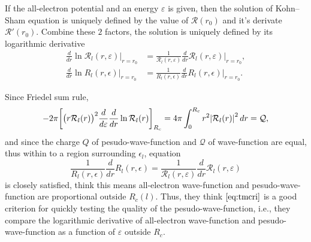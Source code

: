 If the all-electron potential and an energy $\varepsilon$ is given,
then the solution of Kohn--Sham equation is uniquely defined by the
value of $\mathcal{R}(r_0)$ and it's derivate $\mathcal{R}'(r_0)$. Combine
these $2$ factors, the solution is uniquely defined by its  logarithmic
derivative
\begin{align}\label{eq:ld}
	\frac{ d }{ dr } \ln \mathcal{R}_l (r, \varepsilon) \bigg|_{r = r_0}
  &= \frac{ 1 }{ \mathcal{R}_l (r, \varepsilon) }
  \frac{ d }{ dr } \mathcal{R}_l (r, \varepsilon) \bigg|_{r = r_0}, \\
  \frac{ d }{ dr } \ln R_l (r, \epsilon) \bigg|_{r = r_0}
  &= \frac{ 1 }{ R_l (r, \epsilon) }
  \frac{ d }{ dr } R_l (r, \epsilon) \bigg|_{r = r_0}.
\end{align}

Since Friedel sum rule,\cite{Topp:1973cp}
\begin{equation}
	- 2\pi \bigg[ \big(r \mathcal{R}_l(r) \big) ^ 2 \frac{ d }{ d\varepsilon } \frac{ d }{ dr } \ln \mathcal{R}_l(r) \bigg]_{R_c} = 4\pi \int_{0}^{R_c} r^2 \abs{\mathcal{R}_l(r)}^2 \, dr = \mathcal{Q},
\end{equation}
and since the charge $Q$ of pesudo-wave-function and $\mathcal{Q}$ of
wave-function are equal, thus within to a region surrounding $\epsilon_l$,
equation
\begin{equation}\label{eq:tmcri}
	\frac{ 1 }{ R_l (r, \epsilon) }
	\frac{ d }{ dr } R_l (r, \epsilon)
	=
	\frac{ 1 }{ \mathcal{R}_l (r, \varepsilon) }
	\frac{ d }{ dr } \mathcal{R}_l (r, \varepsilon)
\end{equation}
is closely satisfied, 
\cite{Troullier:1991ey} think this means all-electron
wave-function and pesudo-wave-function are proportional outside $R_c(l)$.
Thus, they think $\eqref{eq:tmcri}$ is a good criterion for quickly testing
the quality of the pesudo-wave-function, i.e., they compare the
logarithmic derivative of all-electron wave-function and pesudo-wave-function as a function of $\varepsilon$ outside $R_c$.









